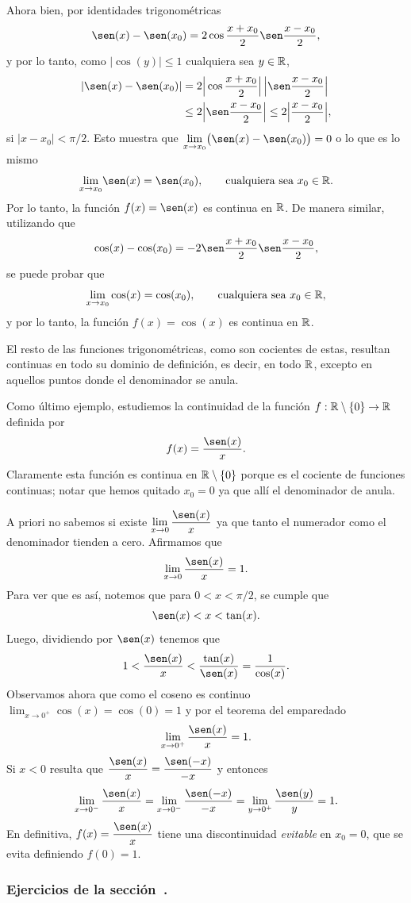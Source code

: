 Ahora bien, por identidades trigonométricas
\[
\sen(x)-\sen(x_0) = 2 \cos\frac{x+x_0}2 \sen\frac{x-x_0}2,
\]
y por lo tanto, como $|\cos(y)|\le 1$ cualquiera sea $y\in\mathbb{R}$,
\begin{align*}
|\sen(x)-\sen(x_0)| 
&= 2 \Big|\cos\frac{x+x_0}2\Big| \, \Big|\sen\frac{x-x_0}2\Big|
\\
&\le 2 \Big|\sen\frac{x-x_0}2\Big| 
\le 2 \Big|\frac{x-x_0}2\Big| ,
\end{align*}
si $|x-x_0|<\pi/2$. Esto muestra que $\D\limxo \big(\sen(x)-\sen(x_0)\big)=0$ o lo que es lo mismo 
\[
\limxo \sen(x)=\sen(x_0), \qquad \text{cualquiera sea $x_0\in\R$}.
\]
Por lo tanto, la función $f(x)=\sen(x)$ es continua en $\mathbb{R}$.
De manera similar, utilizando que
\[
\cos(x)-\cos(x_0) = -2 \sen\frac{x+x_0}2 \sen\frac{x-x_0}2,
\]
se puede probar que 
\[
{\lim_{x\to x_0}} \cos(x)=\cos(x_0), \qquad \text{cualquiera sea $x_0\in\mathbb{R}$},
\]
y por lo tanto, la función $f(x)=\cos(x)$ es continua en $\mathbb{R}$.

El resto de las funciones trigonométricas, como son cocientes de estas, resultan continuas en todo su dominio de definición, es decir, en todo $\mathbb{R}$, excepto en aquellos puntos donde el denominador se anula.

Como último ejemplo, estudiemos la continuidad de la función $f:\mathbb{R}\setminus\{0\}\to\mathbb{R}$ definida por
\[
f(x)=\frac{\sen(x)}{x}.
\]
Claramente esta función es continua en $\mathbb{R}\setminus\{0\}$ porque es el cociente de funciones continuas; notar que hemos quitado $x_0=0$ ya que allí el denominador de anula.

A priori no sabemos si existe $\D\lim_{x\to0}\frac{\sen(x)}{x}$ ya que tanto el numerador como el denominador tienden a cero.
Afirmamos que
\[
\lim_{x\to0}\frac{\sen(x)}{x}=1.
\]
Para ver que es así, notemos que para $0<x<\pi/2$, se cumple que 
\[
\sen(x)<x<\tan (x).
\]
Luego, dividiendo por $\sen(x)$ tenemos que
\[
1<\frac{\sen(x)}{x} < \frac{\tan(x)}{\sen(x)} = \frac{1}{\cos(x)}.
\]
Observamos ahora que como el coseno es continuo $\lim_{x\to 0^+}\cos(x)=\cos(0)=1$ y por el teorema del emparedado
\[
\lim_{x\to0^+}\frac{\sen(x)}{x}=1.
\]
Si $x<0$ resulta que $\D \frac{\sen(x)}{x} = \frac{\sen(-x)}{-x}$ y entonces
\[
\lim_{x\to0^-}\frac{\sen(x)}{x}
=\lim_{x\to0^-}\frac{\sen(-x)}{-x}
=\lim_{y\to0^+}\frac{\sen(y)}{y}=1.
\]
En definitiva, $\D f(x)=\frac{\sen(x)}{x}$ tiene una discontinuidad \emph{evitable} en $x_0=0$, que se evita definiendo $f(0)=1$.


\subsubsection*{Ejercicios de la sección~.}

